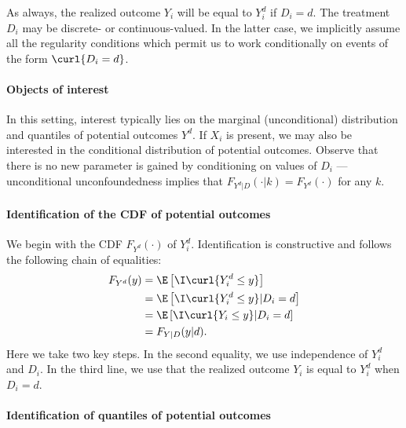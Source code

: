 As always, the realized outcome $Y_i$ will be equal to $Y^d_i$ if $D_i=d$. The treatment $D_i$ may be discrete- or continuous-valued. In the latter case, we implicitly assume all the regularity conditions which permit us to work conditionally on events of the form $\curl{D_i=d}$.

\paragraph{Objects of interest}

 
 In this setting, interest typically lies on the marginal (unconditional) distribution and quantiles of potential outcomes $Y^d$. If  $X_i$ is present, we may also be interested in the conditional distribution of potential outcomes. 
 Observe that there is no new parameter is gained by conditioning on values of $D_i$ --- unconditional unconfoundedness implies that $F_{Y^d|D}(\cdot|k) = F_{Y^d}(\cdot)$ for any $k$.

\paragraph{Identification of the CDF of potential outcomes}
 
 We begin with the CDF $F_{Y^d}(\cdot)$ of $Y^d_i$. Identification is constructive and follows the following chain of equalities:
\begin{align}
	F_{Y^d}(y) & = \E\left[ \I\curl{Y^d_i\leq y} \right] \\
	& = \E\left[ \I\curl{Y^d_i\leq y} |D_i=d \right]\\
	& = \E\left[ \I\curl{Y_i\leq y}|D_i=d \right]\\
	& = F_{Y|D}(y|d). 
\end{align}
Here we take two key steps. In the second equality, we use independence of $Y_i^d$ and $D_i$. In the third line, we use   that the realized outcome $Y_i$ is equal to $Y^d_i$ when $D_i=d$.


\paragraph{Identification of quantiles of potential outcomes}
 
